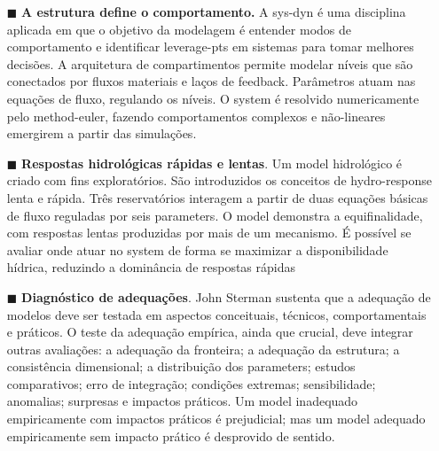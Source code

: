 \documentclass[./main.tex]{subfiles}
\begin{document}
\begin{itemize}
    \item[$\blacksquare$] \textbf{A estrutura define o comportamento.} A \gls{sys-dyn} é uma disciplina aplicada em que o objetivo da modelagem é entender modos de comportamento e identificar \gls{leverage-pts} em sistemas para tomar melhores decisões. A arquitetura de compartimentos permite modelar níveis que são conectados por fluxos materiais e laços de \gls{feedback}. Parâmetros atuam nas equações de fluxo, regulando os níveis. O \gls{system} é resolvido numericamente pelo \gls{method-euler}, fazendo comportamentos complexos e não-lineares emergirem a partir das simulações.    
    \item[$\blacksquare$] \textbf{Respostas hidrológicas rápidas e lentas}. Um \gls{model} hidrológico é criado com fins exploratórios. São introduzidos os conceitos de \gls{hydro-response} lenta e rápida. Três reservatórios interagem a partir de duas equações básicas de fluxo reguladas por seis \gls{parameters}. O \gls{model} demonstra a equifinalidade, com respostas lentas produzidas por mais de um mecanismo. É possível se avaliar onde atuar no \gls{system} de forma se maximizar a disponibilidade hídrica, reduzindo a dominância de respostas rápidas
    
    \item[$\blacksquare$] \textbf{Diagnóstico de adequações}. John Sterman sustenta que a adequação de modelos deve ser testada em aspectos conceituais, técnicos, comportamentais e práticos. O teste da adequação empírica, ainda que crucial, deve integrar outras avaliações: a adequação da fronteira; a adequação da estrutura; a consistência dimensional; a distribuição dos \gls{parameters}; estudos comparativos; erro de integração; condições extremas; sensibilidade; anomalias; surpresas e impactos práticos. Um \gls{model} inadequado empiricamente com impactos práticos é prejudicial; mas um \gls{model} adequado empiricamente sem impacto prático é desprovido de sentido.
    
\end{itemize}
\end{document}
